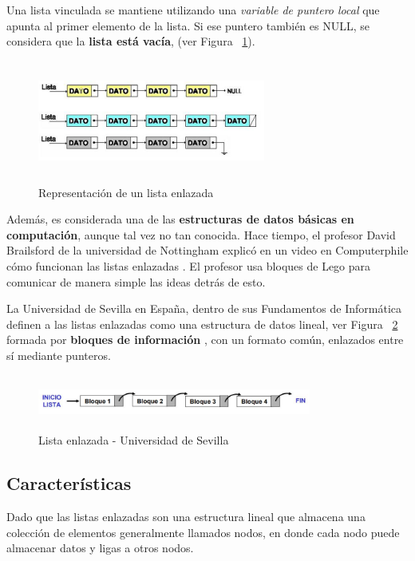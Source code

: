 \documentclass[10pt,journal]{IEEEtran}
\begin{document}
    Una lista vinculada se mantiene utilizando una \textit{variable de puntero local} que apunta al primer elemento de la lista. Si ese puntero también es NULL, se considera que la \textbf{lista está vacía}, (ver Figura  ~\ref{f11}).
    
    \begin{figure}[H]
        \begin{center}
        \includegraphics[width=7.5cm, height=4cm]{Imagenes/Lista.png}
        \caption{Representación de un lista enlazada}
        \label{f11} 
        \end{center}
    \end{figure}
    
    Además, es considerada una de las \textbf{estructuras de datos básicas en computación}, aunque tal vez no tan conocida. Hace tiempo, el profesor David Brailsford de la universidad de Nottingham explicó en un video en Computerphile cómo funcionan las listas enlazadas \cite{Punteros25:online}. El profesor usa bloques de Lego para comunicar de manera simple las ideas detrás de esto.
    
    La Universidad de Sevilla en España, dentro de sus Fundamentos de Informática definen a las listas enlazadas como una estructura de datos lineal, ver Figura  ~\ref{f22} formada por \textbf{bloques de información} \cite{Microsof65:online}, con un formato común, enlazados entre sí mediante punteros.
    
    \begin{figure}[H]
        \begin{center}
        \includegraphics[width=9cm, height=1.8cm]{Imagenes/Lista2.JPG}
        \caption{Lista enlazada - Universidad de Sevilla}
        \label{f22} 
        \end{center}
    \end{figure}
    
    \subsection{\textbf{Características}}
    Dado que las listas enlazadas son una estructura lineal que almacena una colección de elementos generalmente llamados nodos, en donde cada nodo puede almacenar datos y ligas a otros nodos.
    
\end{document}
